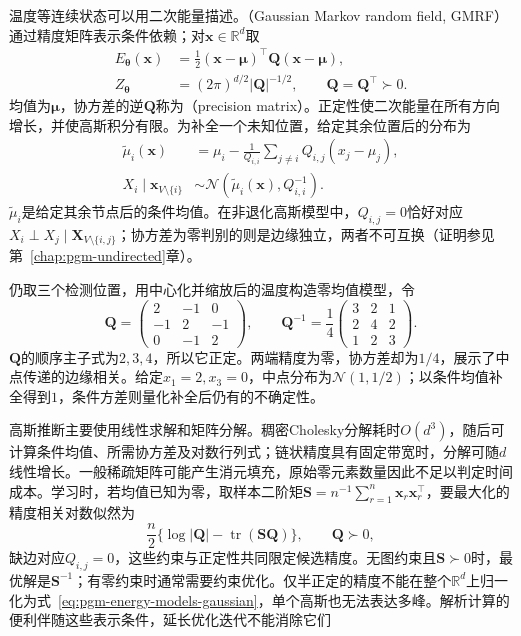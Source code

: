 温度等连续状态可以用二次能量描述。（Gaussian Markov random field, GMRF）通过精度矩阵表示条件依赖；对$\bm{x}\in\mathbb{R}^d$取
\begin{equation}
  \begin{aligned}
    E_{\bm{\theta}}(\bm{x})
      &=\frac12(\bm{x}-\bm{\mu})^\top
                    \bm{Q}(\bm{x}-\bm{\mu}),\\
    Z_{\bm{\theta}}
      &=(2\pi)^{d/2}|\bm{Q}|^{-1/2},
      \qquad \bm{Q}=\bm{Q}^\top\succ0.
  \end{aligned}
  \label{eq:pgm-energy-models-gaussian}
\end{equation}
均值为$\bm{\mu}$，协方差的逆$\bm{Q}$称为（precision matrix）。正定性使二次能量在所有方向增长，并使高斯积分有限。为补全一个未知位置，给定其余位置后的分布为
\[
  \begin{aligned}
    \widetilde{\mu}_i(\bm{x})
      &=\mu_i-\frac{1}{Q_{i,i}}
           \sum_{j\ne i}Q_{i,j}(x_j-\mu_j),\\
    X_i\mid\bm{x}_{V\setminus\{i\}}
      &\sim\mathcal{N}\!\left(
          \widetilde{\mu}_i(\bm{x}),Q_{i,i}^{-1}\right).
  \end{aligned}
\]
$\widetilde{\mu}_i$是给定其余节点后的条件均值。在非退化高斯模型中，$Q_{i,j}=0$恰好对应$X_i\perp X_j\mid\bm{X}_{V\setminus\{i,j\}}$；协方差为零判别的则是边缘独立，两者不可互换（证明参见第~\ref{chap:pgm-undirected}章）。

仍取三个检测位置，用中心化并缩放后的温度构造零均值模型，令
\[
  \bm{Q}=
  \begin{pmatrix}
    2&-1&0\\ -1&2&-1\\ 0&-1&2
  \end{pmatrix},
  \qquad
  \bm{Q}^{-1}=\frac14
  \begin{pmatrix}
    3&2&1\\ 2&4&2\\ 1&2&3
  \end{pmatrix}.
\]
$\bm{Q}$的顺序主子式为$2,3,4$，所以它正定。两端精度为零，协方差却为$1/4$，展示了中点传递的边缘相关。给定$x_1=2,x_3=0$，中点分布为$\mathcal{N}(1,1/2)$；以条件均值补全得到$1$，条件方差则量化补全后仍有的不确定性。

高斯推断主要使用线性求解和矩阵分解。稠密Cholesky分解耗时$O(d^3)$，随后可计算条件均值、所需协方差及对数行列式；链状精度具有固定带宽时，分解可随$d$线性增长。一般稀疏矩阵可能产生消元填充，原始零元素数量因此不足以判定时间成本。学习时，若均值已知为零，取样本二阶矩$\bm{S}=n^{-1}\sum_{r=1}^n\bm{x}_r\bm{x}_r^\top$，要最大化的精度相关对数似然为
\[
  \frac n2\{\log|\bm{Q}|-\operatorname{tr}(\bm{S}\bm{Q})\},
  \qquad \bm{Q}\succ0,
\]
缺边对应$Q_{i,j}=0$，这些约束与正定性共同限定候选精度。无图约束且$\bm{S}\succ0$时，最优解是$\bm{S}^{-1}$；有零约束时通常需要约束优化。仅半正定的精度不能在整个$\mathbb{R}^d$上归一化为式~\eqref{eq:pgm-energy-models-gaussian}，单个高斯也无法表达多峰。解析计算的便利伴随这些表示条件，延长优化迭代不能消除它们

